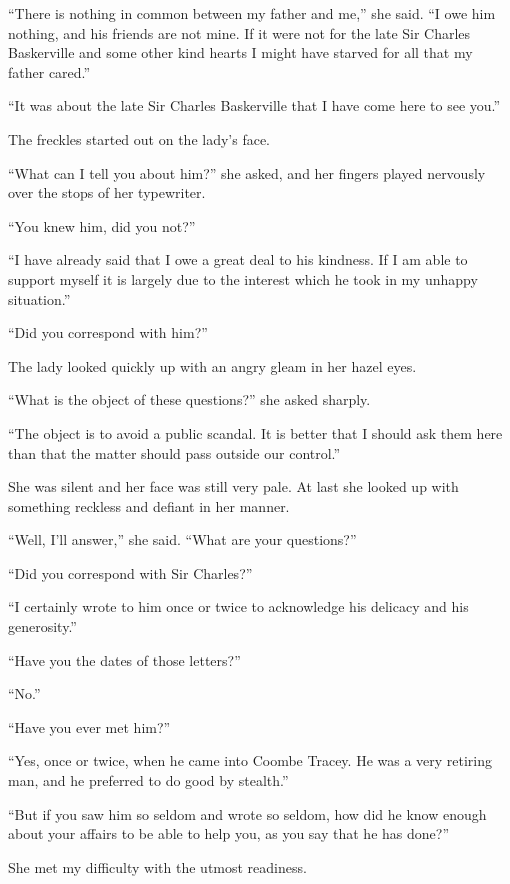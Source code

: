 \documentclass[paper=5.5in:8.5in,BCOR=7mm,twoside,DIV=calc,12pt,usegeometry,openany,chapterprefix,endperiod]{scrbook} %
\begin{document}
\enquote{There is nothing in common between my father and me,} she said. \enquote{I owe him nothing, and his friends are not mine. If it were not for the late Sir Charles Baskerville and some other kind hearts I might have starved for all that my father cared.}

\enquote{It was about the late Sir Charles Baskerville that I have come here to see you.}

The freckles started out on the lady's face.

\enquote{What can I tell you about him?} she asked, and her fingers played nervously over the stops of her typewriter.

\enquote{You knew him, did you not?}

\enquote{I have already said that I owe a great deal to his kindness. If I am able to support myself it is largely due to the interest which he took in my unhappy situation.}

\enquote{Did you correspond with him?}

The lady looked quickly up with an angry gleam in her hazel eyes.

\enquote{What is the object of these questions?} she asked sharply.

\enquote{The object is to avoid a public scandal. It is better that I should ask them here than that the matter should pass outside our control.}

She was silent and her face was still very pale. At last she looked up with something reckless and defiant in her manner.

\enquote{Well, I'll answer,} she said. \enquote{What are your questions?}

\enquote{Did you correspond with Sir Charles?}

\enquote{I certainly wrote to him once or twice to acknowledge his delicacy and his generosity.}

\enquote{Have you the dates of those letters?}

\enquote{No.}

\enquote{Have you ever met him?}

\enquote{Yes, once or twice, when he came into Coombe Tracey. He was a very retiring man, and he preferred to do good by stealth.}

\enquote{But if you saw him so seldom and wrote so seldom, how did he know enough about your affairs to be able to help you, as you say that he has done?}

She met my difficulty with the utmost readiness.
\end{document}
